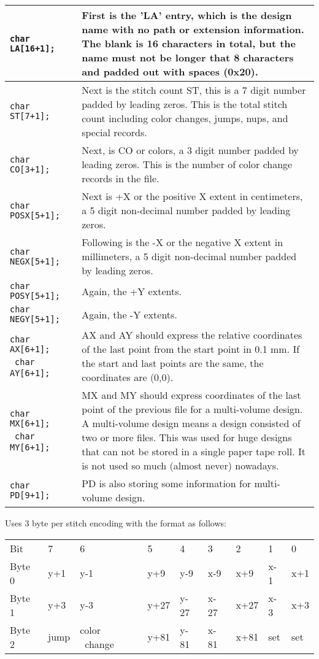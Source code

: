 \documentclass[onesize, a4paper]{refart}
\begin{document}
\begin{tabularx}{\columnwidth}{>{\hsize=0.3\hsize}X >{\hsize=0.7\hsize}X}
\texttt{char LA[16+1];} & First is the 'LA' entry, which is the design name with no
path or extension information. The blank is 16 characters
in total, but the name must not be longer that 8 characters
and padded out with spaces (0x20). \\
\hline
\texttt{char ST[7+1];} & Next is the stitch count ST, this is a 7 digit number
padded by leading zeros. This is the total stitch count
including color changes, jumps, nups, and special records. \\
\hline
\texttt{char CO[3+1];} & Next, is CO or colors, a 3 digit number padded by leading
zeros. This is the number of color change records in the file. \\
\hline
\texttt{char POSX[5+1];} & Next is +X or the positive X extent in centimeters, a 5
digit non-decimal number padded by leading zeros. \\
\hline
\texttt{char NEGX[5+1];} & Following is the -X or the negative X extent in millimeters,
a 5 digit non-decimal number padded by leading zeros. \\
\hline
\texttt{char POSY[5+1];} & Again, the +Y extents. \\
\hline
\texttt{char NEGY[5+1];} & Again, the -Y extents. \\
\hline
\texttt{char AX[6+1];} \break\ \texttt{char AY[6+1];} & AX and AY should express the relative coordinates of the
last point from the start point in 0.1 mm. If the start
and last points are the same, the coordinates are (0,0). \\
\hline
\texttt{char MX[6+1];} \break\ \texttt{char MY[6+1];} &
 MX and MY should express coordinates of the last point of
the previous file for a multi-volume design. A multi-volume design means a design
consisted of two or more files. This was used for huge designs that can not be stored in a
single paper tape roll. It is not used so much (almost never) nowadays. \\
\hline
\texttt{char PD[9+1];} & PD is also storing some information for multi-volume design.
\end{tabularx}

Uses 3 byte per stitch encoding with the format as follows:

\begin{tabularx}{1.1\columnwidth}{X | X X X X X X X X}
Bit & 7 & 6 & 5 & 4 & 3 & 2 & 1 & 0 \\
Byte 0 & y+1 & y-1 & y+9 & y-9 & x-9 & x+9 & x-1 & x+1 \\
Byte 1 & y+3 & y-3 & y+27 & y-27 & x-27 & x+27 & x-3 & x+3 \\
Byte 2 & jump & color \break\ change & y+81 & y-81 & x-81 & x+81 & set & set
\end{tabularx}
\end{document}
